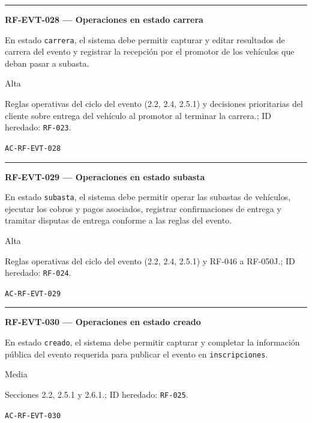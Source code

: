 \documentclass[10pt,letterpaper]{article}
\begin{document}
\vspace{0.25em}\hrule\vspace{0.65em}
\noindent\textbf{RF-EVT-028 --- Operaciones en estado carrera}\par
\begin{description}[style=nextline,leftmargin=3.15cm,labelwidth=2.8cm,font=\normalfont\bfseries]
\item[Obligación] En estado \texttt{carrera}, el sistema debe permitir capturar y editar resultados de carrera del evento y registrar la recepción por el promotor de los vehículos que deban pasar a subasta.
\item[Prioridad] Alta
\item[Procedencia] Reglas operativas del ciclo del evento (2.2, 2.4, 2.5.1) y decisiones prioritarias del cliente sobre entrega del vehículo al promotor al terminar la carrera.; ID heredado: \texttt{RF-023}.
\item[Verificación] \texttt{AC-RF-EVT-028}
\end{description}
\vspace{0.25em}\hrule\vspace{0.65em}
\noindent\textbf{RF-EVT-029 --- Operaciones en estado subasta}\par
\begin{description}[style=nextline,leftmargin=3.15cm,labelwidth=2.8cm,font=\normalfont\bfseries]
\item[Obligación] En estado \texttt{subasta}, el sistema debe permitir operar las subastas de vehículos, ejecutar los cobros y pagos asociados, registrar confirmaciones de entrega y tramitar disputas de entrega conforme a las reglas del evento.
\item[Prioridad] Alta
\item[Procedencia] Reglas operativas del ciclo del evento (2.2, 2.4, 2.5.1) y RF-046 a RF-050J.; ID heredado: \texttt{RF-024}.
\item[Verificación] \texttt{AC-RF-EVT-029}
\end{description}
\vspace{0.25em}\hrule\vspace{0.65em}
\noindent\textbf{RF-EVT-030 --- Operaciones en estado creado}\par
\begin{description}[style=nextline,leftmargin=3.15cm,labelwidth=2.8cm,font=\normalfont\bfseries]
\item[Obligación] En estado \texttt{creado}, el sistema debe permitir capturar y completar la información pública del evento requerida para publicar el evento en \texttt{inscripciones}.
\item[Prioridad] Media
\item[Procedencia] Secciones 2.2, 2.5.1 y 2.6.1.; ID heredado: \texttt{RF-025}.
\item[Verificación] \texttt{AC-RF-EVT-030}
\end{description}
\end{document}
